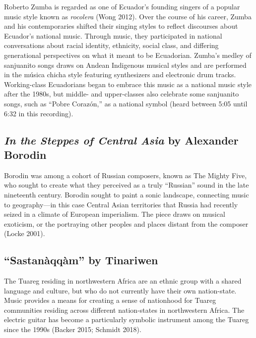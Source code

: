 \documentclass[twoside]{article}
\begin{document}
Roberto Zumba is regarded as one of Ecuador's founding singers of a
popular music style known as \emph{rocolera} (Wong 2012). Over the
course of his career, Zumba and his contemporaries shifted their singing
styles to reflect discourses about Ecuador's national music. Through
music, they participated in national conversations about racial
identity, ethnicity, social class, and differing generational
perspectives on what it meant to be Ecuadorian. Zumba's medley of
sanjuanito songs draws on Andean Indigenous musical styles and are
performed in the música chicha style featuring synthesizers and
electronic drum tracks. Working-class Ecuadorians began to embrace this
music as a national music style after the 1980s, but middle- and
upper-classes also celebrate some sanjuanito songs, such as ``Pobre
Corazón,'' as a national symbol (heard between 5:05 until 6:32 in this
recording).

\hypertarget{in-the-steppes-of-central-asia-by-alexander-borodin}{%
\subsection*{\texorpdfstring{\emph{In the Steppes of Central Asia} by
Alexander
Borodin}{In the Steppes of Central Asia by Alexander Borodin}}\label{in-the-steppes-of-central-asia-by-alexander-borodin}}

Borodin was among a cohort of Russian composers, known as The Mighty
Five, who sought to create what they perceived as a truly ``Russian''
sound in the late nineteenth century. Borodin sought to paint a sonic
landscape, connecting music to geography---in this case Central Asian
territories that Russia had recently seized in a climate of European
imperialism. The piece draws on musical exoticism, or the portraying
other peoples and places distant from the composer (Locke 2001).~

\hypertarget{sastanuxe0qquxe0m-by-tinariwen}{%
\subsection*{``Sastanàqqàm'' by
Tinariwen}\label{sastanuxe0qquxe0m-by-tinariwen}}

The Tuareg residing in northwestern Africa are an ethnic group with a
shared language and culture, but who do not currently have their own
nation-state. Music provides a means for creating a sense of nationhood
for Tuareg communities residing across different nation-states in
northwestern Africa. The electric guitar has become a particularly
symbolic instrument among the Tuareg since the 1990s (Backer 2015;
Schmidt 2018).
\end{document}

